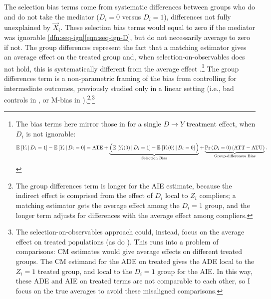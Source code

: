 The selection bias terms come from systematic differences between groups who do and do not take the mediator ($D_i = 0$ versus $D_i = 1$), differences not fully unexplained by $\vec X_i$.
These selection bias terms would equal to zero if the mediator was ignorable \ref{dfn:seq-ign}\eqref{eqn:seq-ign-D}, but do not necessarily average to zero if not.
The group differences represent the fact that a matching estimator gives an average effect on the treated group and, when selection-on-observables does not hold, this is systematically different from the average effect \citep{heckman1998characterizing}.\footnote{
    The bias terms here mirror those in \cite{heckman1998characterizing,angrist2009mostly} for a single $D\to Y$ treatment effect, when $D_i$ is not ignorable:
    \[ \mathbb{E}_{} \left[  Y_i \, \middle\vert \, D_i =1 \right] - \mathbb{E}_{} \left[  Y_i \, \middle\vert \, D_i =0 \right]
        = \text{ATE}
        + \underbrace{\Big( \mathbb{E}_{} \left[  Y_i(0) \, \middle\vert \, D_i =1 \right] - \mathbb{E}_{} \left[  Y_i(0) \, \middle\vert \, D_i =0 \right] \Big)}_{
            \text{Selection Bias}}
        + \underbrace{ \Pr\left( D_i=0 \right) (\text{ATT}- \text{ATU}) }_{
            \text{Group-differences Bias}}. \]
}
The group differences term is a non-parametric framing of the bias from controlling for intermediate outcomes, previously studied only in a linear setting (i.e., bad controls in \citealt{cinelli2024crash}, or M-bias in \citealt{ding2015adjust}).\footnote{
    The group differences term is longer for the AIE estimate, because the indirect effect is comprised from the effect of $D_i$ local to $Z_i$ compliers; a matching estimator gets the average effect among the $D_i = 1$ group, and the longer term adjusts for differences with the average effect among compliers.
}$^{,}$\footnote{
    The selection-on-observables approach could, instead, focus on the average effect on treated populations (as do \citealt{keele2015identifying}).
    This runs into a problem of comparisons: CM estimates would give average effects on different treated groups.
    The CM estimand for the ADE on treated gives the ADE local to the $Z_i = 1$ treated group, and local to the $D_i = 1$ group for the AIE.
    In this way, these ADE and AIE on treated terms are not comparable to each other, so I focus on the true averages to avoid these misaligned comparisons.
}
